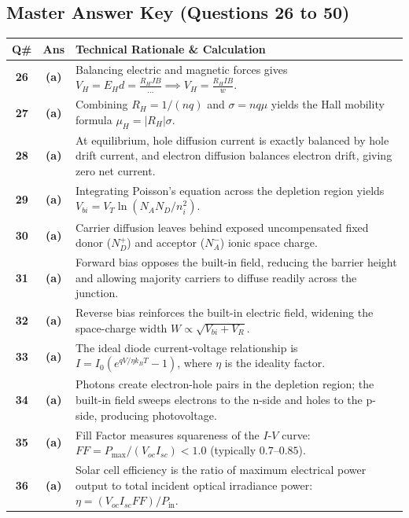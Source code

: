 \newpage

\subsection*{Master Answer Key (Questions 26 to 50)}

{\small
\noindent\begin{tabularx}{\textwidth}{|c|c|X|}
\hline
\textbf{Q\#} & \textbf{Ans} & \textbf{Technical Rationale \& Calculation} \\
\hline
\textbf{26} & \textbf{(a)} & Balancing electric and magnetic forces gives $V_H = E_H d = \frac{R_H J B}{\dots} \implies V_H = \frac{R_H I B}{w}$. \\ \hline
\textbf{27} & \textbf{(a)} & Combining $R_H = 1/(nq)$ and $\sigma = nq\mu$ yields the Hall mobility formula $\mu_H = |R_H|\sigma$. \\ \hline
\textbf{28} & \textbf{(a)} & At equilibrium, hole diffusion current is exactly balanced by hole drift current, and electron diffusion balances electron drift, giving zero net current. \\ \hline
\textbf{29} & \textbf{(a)} & Integrating Poisson's equation across the depletion region yields $V_{bi} = V_T \ln(N_A N_D / n_i^2)$. \\ \hline
\textbf{30} & \textbf{(a)} & Carrier diffusion leaves behind exposed uncompensated fixed donor ($N_D^+$) and acceptor ($N_A^-$) ionic space charge. \\ \hline
\textbf{31} & \textbf{(a)} & Forward bias opposes the built-in field, reducing the barrier height and allowing majority carriers to diffuse readily across the junction. \\ \hline
\textbf{32} & \textbf{(a)} & Reverse bias reinforces the built-in electric field, widening the space-charge width $W \propto \sqrt{V_{bi} + V_R}$. \\ \hline
\textbf{33} & \textbf{(a)} & The ideal diode current-voltage relationship is $I = I_0 (e^{qV/\eta k_BT} - 1)$, where $\eta$ is the ideality factor. \\ \hline
\textbf{34} & \textbf{(a)} & Photons create electron-hole pairs in the depletion region; the built-in field sweeps electrons to the n-side and holes to the p-side, producing photovoltage. \\ \hline
\textbf{35} & \textbf{(a)} & Fill Factor measures squareness of the $I$-$V$ curve: $FF = P_{\text{max}} / (V_{oc} I_{sc}) < 1.0$ (typically $0.7\text{--}0.85$). \\ \hline
\textbf{36} & \textbf{(a)} & Solar cell efficiency is the ratio of maximum electrical power output to total incident optical irradiance power: $\eta = (V_{oc} I_{sc} FF)/P_{\text{in}}$. \\ \hline

\end{tabularx}}

